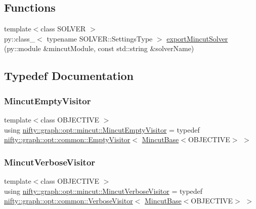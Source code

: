 \subsection*{Functions}
\begin{DoxyCompactItemize}
\item 
{\footnotesize template$<$class S\+O\+L\+V\+ER $>$ }\\py\+::class\+\_\+$<$ typename S\+O\+L\+V\+E\+R\+::\+Settings\+Type $>$ \hyperlink{namespacenifty_1_1graph_1_1opt_1_1mincut_aeda4464d98c5dab3438e95fb91851183}{export\+Mincut\+Solver} (py\+::module \&mincut\+Module, const std\+::string \&solver\+Name)
\end{DoxyCompactItemize}


\subsection{Typedef Documentation}
\mbox{\label{namespacenifty_1_1graph_1_1opt_1_1mincut_abaeb42be72a153c73386cda5564721b2}} 
\subsubsection{\texorpdfstring{Mincut\+Empty\+Visitor}{MincutEmptyVisitor}}
{\footnotesize\ttfamily template$<$class O\+B\+J\+E\+C\+T\+I\+VE $>$ \\
using \hyperlink{namespacenifty_1_1graph_1_1opt_1_1mincut_abaeb42be72a153c73386cda5564721b2}{nifty\+::graph\+::opt\+::mincut\+::\+Mincut\+Empty\+Visitor} = typedef \hyperlink{classnifty_1_1graph_1_1opt_1_1common_1_1EmptyVisitor}{nifty\+::graph\+::opt\+::common\+::\+Empty\+Visitor}$<$ \hyperlink{classnifty_1_1graph_1_1opt_1_1mincut_1_1MincutBase}{Mincut\+Base}$<$O\+B\+J\+E\+C\+T\+I\+VE$>$ $>$}

\mbox{\label{namespacenifty_1_1graph_1_1opt_1_1mincut_add3f7a943158f70c24847778a52bd29a}} 
\subsubsection{\texorpdfstring{Mincut\+Verbose\+Visitor}{MincutVerboseVisitor}}
{\footnotesize\ttfamily template$<$class O\+B\+J\+E\+C\+T\+I\+VE $>$ \\
using \hyperlink{namespacenifty_1_1graph_1_1opt_1_1mincut_add3f7a943158f70c24847778a52bd29a}{nifty\+::graph\+::opt\+::mincut\+::\+Mincut\+Verbose\+Visitor} = typedef \hyperlink{classnifty_1_1graph_1_1opt_1_1common_1_1VerboseVisitor}{nifty\+::graph\+::opt\+::common\+::\+Verbose\+Visitor}$<$ \hyperlink{classnifty_1_1graph_1_1opt_1_1mincut_1_1MincutBase}{Mincut\+Base}$<$O\+B\+J\+E\+C\+T\+I\+VE$>$ $>$}

